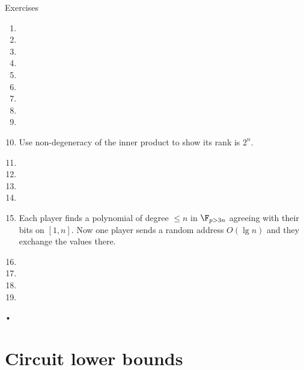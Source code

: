 Exercises
\begin{enumerate}
\item
\item
\item
\item
\item
\item
\item
\item
\item
\item Use non-degeneracy of the inner product to show its rank is $2^n$.
\item
\item
\item
\item
\item Each player finds a polynomial of degree $\le n$ in $\F_{p>3n}$ agreeing with their bits on $[1,n]$. Now one player sends a random address $O(\lg n)$ and they exchange the values there.
\item
\item
\item
\item

\end{enumerate}•
\section{Circuit lower bounds}

